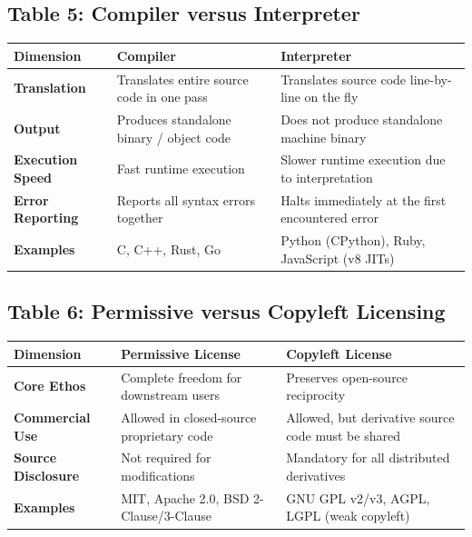 \subsection*{Table 5: Compiler versus Interpreter}
\begin{center}
\small
\begin{tabularx}{\textwidth}{lXX}
\toprule
\textbf{Dimension} & \textbf{Compiler} & \textbf{Interpreter} \\
\midrule
\textbf{Translation} & Translates entire source code in one pass & Translates source code line-by-line on the fly \\
\textbf{Output} & Produces standalone binary / object code & Does not produce standalone machine binary \\
\textbf{Execution Speed} & Fast runtime execution & Slower runtime execution due to interpretation \\
\textbf{Error Reporting} & Reports all syntax errors together & Halts immediately at the first encountered error \\
\textbf{Examples} & C, C++, Rust, Go & Python (CPython), Ruby, JavaScript (v8 JITs) \\
\bottomrule
\end{tabularx}
\end{center}

\subsection*{Table 6: Permissive versus Copyleft Licensing}
\begin{center}
\small
\begin{tabularx}{\textwidth}{lXX}
\toprule
\textbf{Dimension} & \textbf{Permissive License} & \textbf{Copyleft License} \\
\midrule
\textbf{Core Ethos} & Complete freedom for downstream users & Preserves open-source reciprocity \\
\textbf{Commercial Use} & Allowed in closed-source proprietary code & Allowed, but derivative source code must be shared \\
\textbf{Source Disclosure} & Not required for modifications & Mandatory for all distributed derivatives \\
\textbf{Examples} & MIT, Apache 2.0, BSD 2-Clause/3-Clause & GNU GPL v2/v3, AGPL, LGPL (weak copyleft) \\
\bottomrule
\end{tabularx}
\end{center}

